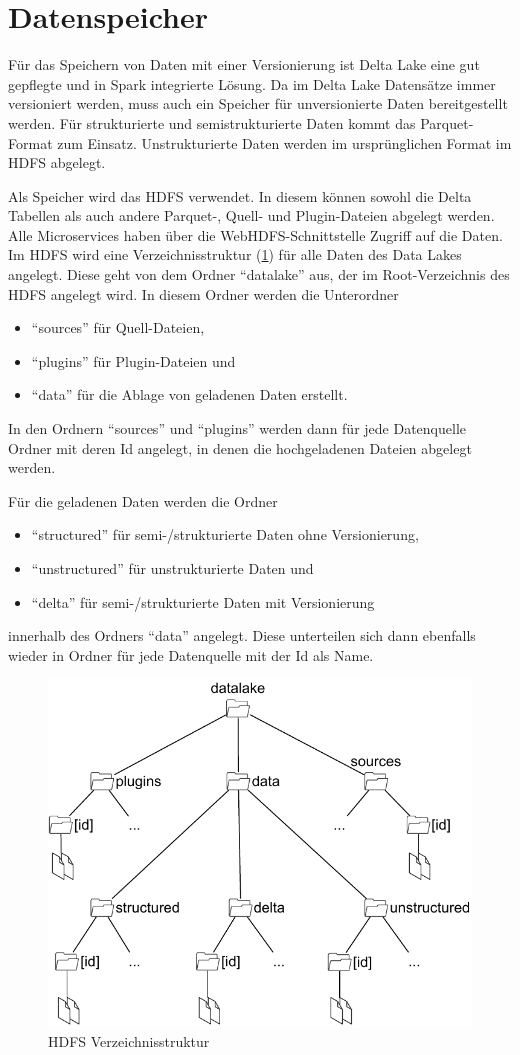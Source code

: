 \section{Datenspeicher}

Für das Speichern von Daten mit einer Versionierung ist Delta Lake eine gut gepflegte und in Spark integrierte Lösung.
Da im Delta Lake Datensätze immer versioniert werden, muss auch ein Speicher für unversionierte Daten bereitgestellt werden.
Für strukturierte und semistrukturierte Daten kommt das Parquet-Format zum Einsatz.
Unstrukturierte Daten werden im ursprünglichen Format im HDFS abgelegt.

Als Speicher wird das HDFS verwendet.
In diesem können sowohl die Delta Tabellen als auch andere Parquet-, Quell- und Plugin-Dateien abgelegt werden.
Alle Microservices haben über die WebHDFS-Schnittstelle Zugriff auf die Daten.
Im HDFS wird eine Verzeichnisstruktur (\cref{fig:hdfs-folder}) für alle Daten des Data Lakes angelegt.
Diese geht von dem Ordner "`datalake"' aus, der im Root-Verzeichnis des HDFS angelegt wird.
In diesem Ordner werden die Unterordner
\begin{itemize}
    \item "`sources"' für Quell-Dateien,
    \item "`plugins"' für Plugin-Dateien und
    \item "`data"' für die Ablage von geladenen Daten erstellt.
\end{itemize}

In den Ordnern "`sources"' und "`plugins"' werden dann für jede Datenquelle Ordner mit deren Id angelegt, in denen die hochgeladenen Dateien abgelegt werden.

Für die geladenen Daten werden die Ordner \begin{itemize}
    \item "`structured"' für semi-/strukturierte Daten ohne Versionierung,
    \item "`unstructured"' für unstrukturierte Daten und 
    \item "`delta"' für semi-/strukturierte Daten mit Versionierung
\end{itemize}
innerhalb des Ordners "`data"' angelegt.
Diese unterteilen sich dann ebenfalls wieder in Ordner für jede Datenquelle mit der Id als Name.

\begin{figure}
    \centering
    \includegraphics[width=.6\textwidth]{Grafiken/Umsetzung-Verzeichnisse.pdf}
    \caption{HDFS Verzeichnisstruktur}
    \label{fig:hdfs-folder}
\end{figure}